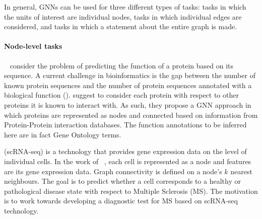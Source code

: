 \documentclass[
	fontsize=10pt, %
	twoside=true, %
	secnumdepth=1, %
  toc=indentunnumbered %
]{kaobook}
\begin{document}
In general, GNNs can be used for three different types of tasks:
 tasks in which the units of interest are individual nodes,
 tasks in which individual edges are considered, and
 tasks in which a statement about the entire graph is made.

\paragraph{Node-level tasks}
\citeauthor{you_DeepGraphGOGraphNeural_2021}~\cite{you_DeepGraphGOGraphNeural_2021} consider the problem of predicting the
function of a protein based on its sequence. A current challenge in
bioinformatics is the gap between the number of known protein sequences and the
number of protein sequences annotated with a biological function
(). \citeauthor{you_DeepGraphGOGraphNeural_2021}
suggest to consider each protein with respect to other proteins it is known to
interact with. As such, they propose a GNN approach in which proteins are
represented as nodes and connected based on information from Protein-Protein
interaction databases. The function annotations to be inferred here are in fact
Gene Ontology terms.

 (scRNA-seq) is a technology that provides gene
expression data on the level of individual cells. In the work of
\citeauthor{ravindra_disease_2020}~\cite{ravindra_disease_2020}, each cell is
represented as a node and features are its gene expression data. Graph
connectivity is defined on a node's $k$ nearest neighbours. The goal is to
predict whether a cell corresponds to a healthy or pathological disease state
with respect to Multiple Sclerosis (MS). The motivation is to work towards developing a
diagnostic test for MS based on scRNA-seq technology.


\end{document}
